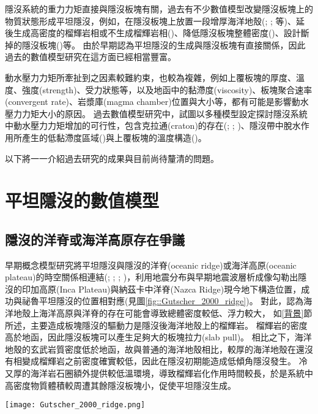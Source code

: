 隱沒系統的重力力矩直接與隱沒板塊有關，過去有不少數值模型改變隱沒板塊上的物質狀態形成平坦隱沒，例如，在隱沒板塊上放置一段增厚海洋地殼(\citealp{van2002role}; \citealp{Liu2016}; \citealp{Hu2016}等)、延後生成高密度的榴輝岩相或不生成榴輝岩相(\citealp{van2002role})、降低隱沒板塊整體密度(\citealp{Gerya2009})、設計斷掉的隱沒板塊(\citealp{Liu2016})等。
由於早期認為平坦隱沒的生成與隱沒板塊有直接關係，因此過去的數值模型研究在這方面已經相當豐富。

動水壓力力矩所牽扯到之因素較難約束，也較為複雜，例如上覆板塊的厚度、溫度、強度(strength)、受力狀態等，以及地函中的黏滯度(viscosity)、板塊聚合速率(convergent rate)、岩漿庫(magma chamber)位置與大小等，都有可能是影響動水壓力力矩大小的原因。
過去數值模型研究中，試圖以多種模型設定探討隱沒系統中動水壓力力矩增加的可行性，包含克拉通(craton)的存在(\citealp{Manea2012Chile}; \citealp{Liu2016}; \citealp{Hu2016})、隱沒帶中脫水作用所產生的低黏滯度區域(\citealp{Manea2007})與上覆板塊的溫度構造(\citealp{Thermal2012})。

以下將一一介紹過去研究的成果與目前尚待釐清的問題。
\newpage
\section{平坦隱沒的數值模型}\label{平坦隱沒的數值模型}
\subsection{隱沒的洋脊或海洋高原存在爭議}\label{隱沒的洋脊或海洋高原存在爭議}
早期概念模型研究將平坦隱沒與隱沒的洋脊(oceanic ridge)或海洋高原(oceanic plateau)的時空關係相連結(\citealp{pilger1981plate}; \citealp{henderson1984mesozoic}; \citealp{Gutscher2000A}; \citealp{gutscher2002andean})，\citet{Gutscher2000A}利用地震分布與早期地震波層析成像勾勒出隱沒的印加高原(Inca Plateau)與納茲卡中洋脊(Nazca Ridge)現今地下構造位置，成功與祕魯平坦隱沒的位置相對應(見圖\ref{fig::Gutscher_2000_ridge})。
對此，\citet{Gutscher2000A}認為海洋地殼上海洋高原與洋脊的存在可能會導致總體密度較低、浮力較大，
如\ref{背景}節所述，主要造成板塊隱沒的驅動力是隱沒後海洋地殼上的榴輝岩。
榴輝岩的密度高於地函，因此隱沒板塊可以產生足夠大的板塊拉力(slab pull)。
相比之下，海洋地殼的玄武岩質密度低於地函，故與普通的海洋地殼相比，較厚的海洋地殼在還沒有相變成榴輝岩之前密度確實較低，因此在隱沒初期能造成低傾角隱沒發生。
冷又厚的海洋岩石圈額外提供較低溫環境，導致榴輝岩化作用時間較長，於是系統中高密度物質體積較周遭其餘隱沒板塊小，促使平坦隱沒生成。

\begin{figure*}[htp]
    \centering
    \texttt{[image: Gutscher\_2000\_ridge.png]}
    \caption[南美洲板塊構造圖，摘自\citet{Gutscher2000A}]{南美洲板塊構造圖，摘自\citet{Gutscher2000A}。粗黑線標出平坦隱沒段，灰色陰影區標示隱沒的海洋高原與洋脊，三角形為活動火山。板塊聚合速率由白色箭頭標出，參考自\citet{demets1990current}。
    }
    \label{fig::Gutscher_2000_ridge}
\end{figure*}

